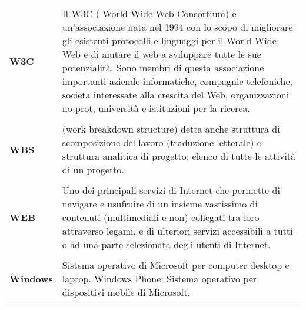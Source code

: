 \begin{longtable}{L{4cm} p{10cm}}
\textbf{W3C} & Il W3C ( World Wide Web Consortium) è un’associazione nata nel 1994 con lo scopo di migliorare gli esistenti protocolli e linguaggi per il World Wide Web e di aiutare il web a sviluppare tutte le sue potenzialità. Sono membri di questa associazione importanti aziende informatiche, compagnie telefoniche, societa interessate alla crescita del Web, organizzazioni no-prot, università e istituzioni per la ricerca. \\ 
 \\ 
\textbf{WBS} & (work breakdown structure) detta anche struttura di scomposizione del lavoro (traduzione letterale) o struttura analitica di progetto; elenco di tutte le attività di un progetto. \\ 
 \\ 
\textbf{WEB} & Uno dei principali servizi di Internet che permette di navigare e usufruire di un insieme vastissimo di contenuti (multimediali e non) collegati tra loro attraverso legami, e di ulteriori servizi accessibili a tutti o ad una parte selezionata degli utenti di Internet. \\ 
 \\ 
\textbf{Windows} & Sistema operativo di Microsoft per computer desktop e laptop. Windows Phone: Sistema operativo per dispositivi mobile di Microsoft. \\ 
 \\ 
\end{longtable} 
 